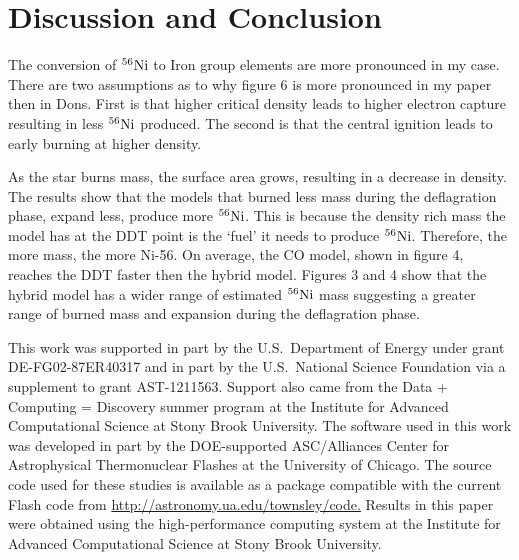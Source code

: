 \documentclass[iop,apj]{emulateapj}
\newcommand{\Ni}[1]{\ensuremath{{}^{#1}{\rm Ni}}}
\begin{document}
\section{Discussion and Conclusion}


The conversion of \Ni{56} to Iron group elements are more pronounced in my
case. There are two assumptions as to why figure 6 is more pronounced
in my paper then in Dons.  First is that higher critical density leads
to higher electron capture resulting in less \Ni{56} produced. The second
is that the central ignition leads to early burning at higher density.


As the star burns mass, the surface area grows, resulting in a decrease
in density. The results show that the models that burned less mass during
the deflagration phase, expand less, produce more \Ni{56}. This is because
the density rich mass the model has at the DDT point is the ‘fuel’
it needs to produce \Ni{56}. Therefore, the more mass, the more Ni-56. On
average, the CO model, shown in figure 4, reaches the DDT faster then
the hybrid model. Figures 3 and 4 show that the hybrid model has a wider
range of estimated \Ni{56} mass suggesting a greater range of burned mass
and expansion during the deflagration phase.

This work was supported in part by the U.S.\ Department of Energy under
grant DE-FG02-87ER40317 and in part by the U.S.\ National Science Foundation
via a supplement to grant AST-1211563. 
Support also came from the Data + Computing = Discovery summer program at
the Institute for Advanced Computational Science at Stony Brook University.
The software used in this work was developed in part by the DOE-supported 
ASC/Alliances Center for Astrophysical Thermonuclear Flashes at the 
University of Chicago. 
The source code used for
these studies is available as a package compatible with the
current Flash code from \url{http://astronomy.ua.edu/townsley/code.}
Results in this
paper were obtained using the high-performance computing system at the
Institute for Advanced Computational Science at Stony Brook
University. 




\end{document}

